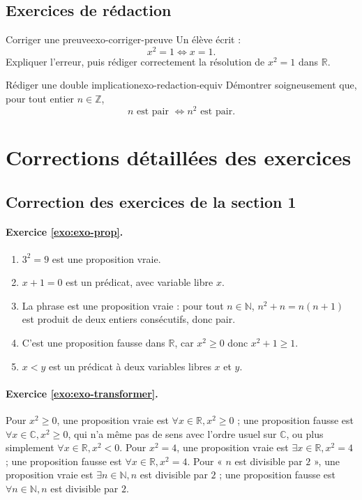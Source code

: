 \documentclass[11pt,a4paper]{article}
\newcommand{\R}{\mathbb{R}}
\newcommand{\N}{\mathbb{N}}
\newcommand{\Z}{\mathbb{Z}}
\newcommand{\C}{\mathbb{C}}
\begin{document}
\subsection{Exercices de rédaction}

\begin{exercicebox}{Corriger une preuve}{exo-corriger-preuve}
Un élève écrit :
\[
x^2=1 \Longleftrightarrow x=1.
\]
Expliquer l'erreur, puis rédiger correctement la résolution de $x^2=1$ dans $\R$.
\end{exercicebox}

\begin{exercicebox}{Rédiger une double implication}{exo-redaction-equiv}
Démontrer soigneusement que, pour tout entier $n\in\Z$,
\[
n\text{ est pair }\Longleftrightarrow n^2\text{ est pair}.
\]
\end{exercicebox}

\section{Corrections détaillées des exercices}

\subsection*{Correction des exercices de la section 1}

\paragraph{Exercice \ref{exo:exo-prop}.}
\begin{enumerate}
  \item $3^2=9$ est une proposition vraie.
  \item $x+1=0$ est un prédicat, avec variable libre $x$.
  \item La phrase est une proposition vraie : pour tout $n\in\N$, $n^2+n=n(n+1)$ est produit de deux entiers consécutifs, donc pair.
  \item C'est une proposition fausse dans $\R$, car $x^2\geq0$ donc $x^2+1\geq1$.
  \item $x<y$ est un prédicat à deux variables libres $x$ et $y$.
\end{enumerate}

\paragraph{Exercice \ref{exo:exo-transformer}.}
Pour $x^2\geq0$, une proposition vraie est $\forall x\in\R, x^2\geq0$ ; une proposition fausse est $\forall x\in\C, x^2\geq0$, qui n'a même pas de sens avec l'ordre usuel sur $\C$, ou plus simplement $\forall x\in\R, x^2<0$. Pour $x^2=4$, une proposition vraie est $\exists x\in\R,x^2=4$ ; une proposition fausse est $\forall x\in\R,x^2=4$. Pour « $n$ est divisible par $2$ », une proposition vraie est $\exists n\in\N, n$ est divisible par $2$ ; une proposition fausse est $\forall n\in\N, n$ est divisible par $2$.
\end{document}
